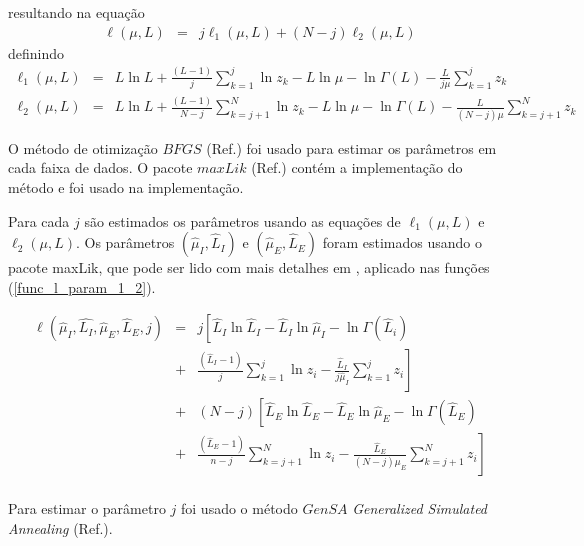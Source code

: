 \documentclass[journal,article,submit,moreauthors,pdftex]{Definitions/mdpi}
\begin{document}
 resultando na equação
\begin{equation}\nonumber
\begin{array}{ccc}  
  \ell(\mu, L)&=&j\ell_1(\mu, L) + (N - j)\ell_2(\mu, L)
 \end{array}
 \end{equation}
definindo
 \begin{equation}
\begin{array}{ccc}\label{func_l_param_1_2}
    \ell_1(\mu, L)&=&L\ln L+\frac{(L-1)}{j}\sum_{k=1}^{j}\ln z_k-L\ln\mu-\ln\Gamma(L) -\frac{L}{j\mu}\sum_{k=1}^{j} z_k\\
    \ell_2(\mu, L)&=&L\ln L+\frac{(L-1)}{N-j}\sum_{k=j+1}^{N}\ln z_k-L\ln\mu-\ln\Gamma(L) -\frac{L}{(N-j)\mu}\sum_{k=j+1}^{N} z_k
 \end{array}
 \end{equation}
 
O método de otimização $BFGS$ (Ref.\cite{nw_2006}) foi usado para estimar os parâmetros em cada faixa de dados. O pacote $maxLik$ (Ref.\cite{ht_2011}) contém a implementação do método e foi usado na implementação.
 
Para cada $j$ são estimados os parâmetros usando as equações de $\ell_1(\mu, L)$ e $\ell_2(\mu, L)$. Os parâmetros $(\hat{\mu}_I, \hat{L}_I)$ e $(\hat{\mu}_E, \hat{L}_E)$ foram estimados usando o pacote maxLik, que pode ser lido com mais detalhes em \cite{ht_2011}, aplicado nas funções (\ref{func_l_param_1_2}).


\begin{equation}\label{cap_acf_16}
 \begin{array}{lll}
\ell(\hat{\mu}_I, \hat{L_I},\hat{\mu}_E, \hat{L}_E, j)&=&j\left[  \hat{L}_I\ln \hat{L}_I -\hat{L}_I \ln \hat{\mu}_I -\ln \Gamma(\hat{L}_i) \right. \\
&+& \left.\frac{(\hat{L}_I  - 1)}{j} \sum_{k=1}^{j}  \ln z_{i}  -\frac{\hat{L}_I}{j\hat{\mu}_I} \sum_{k=1}^{j}   z_i\right] \\
                                               &+&(N-j)\left[\hat{L}_E\ln \hat{L}_E -\hat{L}_E \ln \hat{\mu}_E-\ln \Gamma(\hat{L}_E)\right. \\
                                               &+&\left. \frac{(\hat{L}_E - 1)}{n-j} \sum_{k=j+1}^{N}\ln z_{i}-\frac{\hat{L}_E}{(N-j)\mu_E} \sum_{k=j+1}^{N}z_i\right] \\
 \end{array}
 \end{equation}

Para estimar o  parâmetro $j$ foi usado o método $GenSA$ \textit{Generalized Simulated Annealing} (Ref.\cite{xgsh}).
\end{document}
